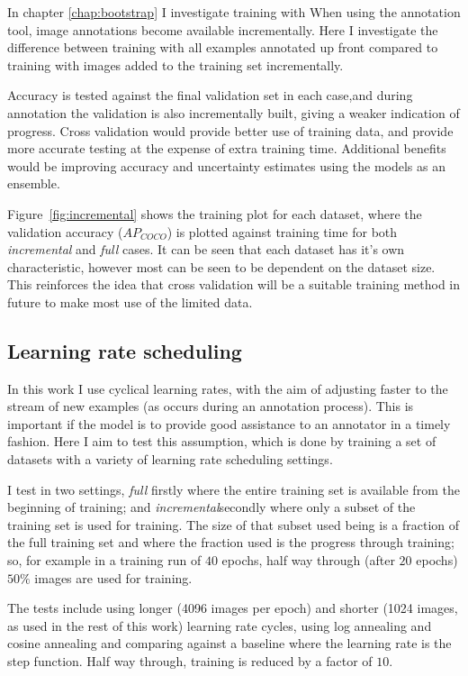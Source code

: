 In chapter \ref{chap:bootstrap} I investigate training with 
When using the annotation tool, image annotations become available incrementally. Here I investigate the difference between training with all examples annotated up front compared to training with images added to the training set incrementally. 

Accuracy is tested against the final validation set in each case,and during annotation the validation is also incrementally built, giving a weaker indication of progress. Cross validation would provide better use of training data, and provide more accurate testing at the expense of extra training time. Additional benefits would be improving accuracy and uncertainty estimates using the models as an ensemble.


Figure~\ref{fig:incremental} shows the training plot for each dataset, where the validation accuracy ($AP_{COCO}$) is plotted against training time for both \emph{incremental} and \emph{full} cases. It can be seen that each dataset has it's own characteristic, however most can be seen to be dependent on the dataset size. This reinforces the idea that cross validation will be a suitable training method in future to make most use of the limited data.


\subsection {Learning rate scheduling}
\label{sec:lr_schedule_exp}

In this work I use cyclical learning rates, with the aim of adjusting faster to the stream of new examples (as occurs during an annotation process). This is important if the model is to provide good assistance to an annotator in a timely fashion. Here I aim to test this assumption, which is done by training a set of datasets with a variety of learning rate scheduling settings. 

I test in two settings, \emph{full} firstly where the entire training set is available from the beginning of training; and \emph{incremental}secondly where only a subset of the training set is used for training. The size of that subset used being is a fraction of the full training set and where the fraction used is the progress through training; so, for example in a training run of $40$ epochs, half way through (after $20$ epochs) $50\%$ images are used for training. 

The tests include using longer (4096 images per epoch) and shorter (1024 images, as used in the rest of this work) learning rate cycles, using log annealing and cosine annealing and comparing against a baseline where the learning rate is the step function. Half way through, training is reduced by a factor of $10$.

